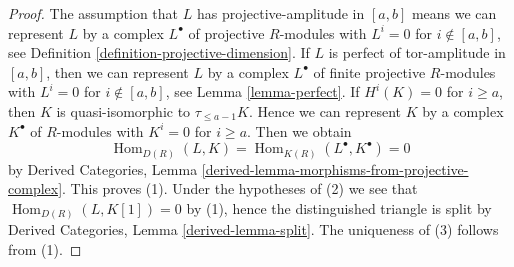 \documentclass[10pt,a4paper]{amsart}
\theoremstyle{plain}
\theoremstyle{definition}
\theoremstyle{remark}
\numberwithin{equation}{subsection}
\def\Hom{\mathop{\mathrm{Hom}}\nolimits}
\begin{document}
\begin{proof}
The assumption that $L$ has projective-amplitude in $[a, b]$ means we
can represent $L$ by a complex $L^\bullet$ of projective $R$-modules
with $L^i = 0$ for $i \not \in [a, b]$, see Definition
\ref{definition-projective-dimension}.
If $L$ is perfect of tor-amplitude in $[a, b]$, then
we can represent $L$ by a complex $L^\bullet$ of finite projective $R$-modules
with $L^i = 0$ for $i \not \in [a, b]$, see Lemma \ref{lemma-perfect}.
If $H^i(K) = 0$ for $i \geq a$, then $K$ is quasi-isomorphic
to $\tau_{\leq a - 1}K$. Hence we can represent $K$ by a complex
$K^\bullet$ of $R$-modules with $K^i = 0$ for $i \geq a$. Then we obtain
$$
\Hom_{D(R)}(L, K) = \Hom_{K(R)}(L^\bullet, K^\bullet) = 0
$$
by Derived Categories, Lemma
\ref{derived-lemma-morphisms-from-projective-complex}.
This proves (1). Under the hypotheses of (2) we see that
$\Hom_{D(R)}(L, K[1]) = 0$ by (1), hence
the distinguished triangle is split by
Derived Categories, Lemma \ref{derived-lemma-split}.
The uniqueness of (3) follows from (1).
\end{proof}
\end{document}
